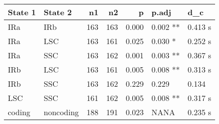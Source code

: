 \begin{table}[ht]
\centering
\begin{tabular}{llrrrll}
  \hline
State 1 & State 2 & n1 & n2 & p & p.adj & d\_c \\ 
  \hline
IRa & IRb &  163 &  163 & 0.000 & 0.002 ** & 0.413 s \\ 
  IRa & LSC &  163 &  161 & 0.025 & 0.030 * & 0.252 s \\ 
  IRa & SSC &  163 &  162 & 0.001 & 0.003 ** & 0.367 s \\ 
  IRb & LSC &  163 &  161 & 0.005 & 0.008 ** & 0.313 s \\ 
  IRb & SSC &  163 &  162 & 0.229 & 0.229 & 0.134 \\ 
  LSC & SSC &  161 &  162 & 0.005 & 0.008 ** & 0.317 s \\ 
  coding & noncoding &  188 &  191 & 0.023 &    NANA & 0.235 s \\ 
   \hline
\end{tabular}
\end{table}
